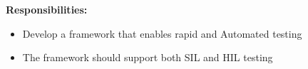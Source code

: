 \documentclass[10pt,a4paper,ragged2e,withhyper]{altacv}
\begin{document}
            \smallskip
            \textbf{Responsibilities:}\\
            \vspace{0.5em}
            \begin{itemize}
                \item Develop a framework that enables rapid and Automated testing
                \item The framework should support both SIL and HIL testing
            \end{itemize}
\end{document}
